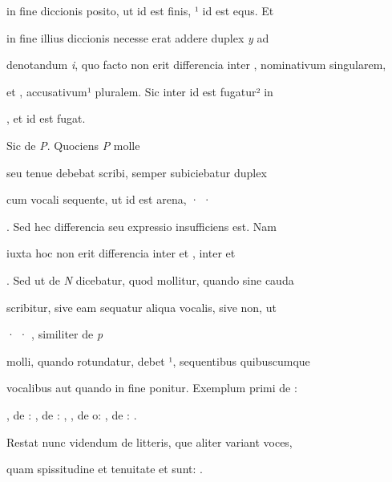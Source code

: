  in fine diccionis posito, ut  id est finis, ¹ id est equs. Et

in fine illius diccionis  necesse erat addere duplex \textit{y} ad

denotandum \textit{i}, quo facto non erit differencia inter , nominativum singularem,

et , accusativum¹ pluralem. Sic inter  id est fugatur² in 

\splitlines
{}, et  id est fugat.

\indentK Sic de \textit{P}. Quociens \textit{P} molle

\fulllines
seu tenue debebat scribi, semper subiciebatur duplex 

cum vocali sequente, ut  id est arena, · ·

. Sed hec differencia seu expressio insufficiens est. Nam

iuxta hoc non erit differencia inter  et , inter  et

. Sed ut de \textit{N} dicebatur, quod mollitur, quando sine cauda

scribitur, sive eam sequatur aliqua vocalis, sive non, ut

 · · , similiter de \textit{p}

molli, quando rotundatur, debet ¹, sequentibus quibuscumque

vocalibus aut quando in fine ponitur. Exemplum primi de :

, de : , de : , , de o\parkosz{}: , de : .

\indentP Restat nunc videndum de litteris, que aliter variant voces,

\splitlines
quam spissitudine et tenuitate et sunt:    .

